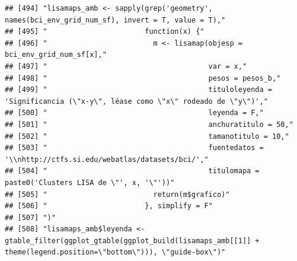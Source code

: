 \documentclass[11pt,]{article}
\begin{document}
\begin{verbatim}
## [494] "lisamaps_amb <- sapply(grep('geometry', names(bci_env_grid_num_sf), invert = T, value = T),"                                                                           
## [495] "                       function(x) {"                                                                                                                                  
## [496] "                         m <- lisamap(objesp = bci_env_grid_num_sf[x],"                                                                                                
## [497] "                                      var = x,"                                                                                                                        
## [498] "                                      pesos = pesos_b,"                                                                                                                
## [499] "                                      tituloleyenda = 'Significancia (\"x-y\", léase como \"x\" rodeado de \"y\")',"                                                   
## [500] "                                      leyenda = F,"                                                                                                                    
## [501] "                                      anchuratitulo = 50,"                                                                                                             
## [502] "                                      tamanotitulo = 10,"                                                                                                              
## [503] "                                      fuentedatos = '\\nhttp://ctfs.si.edu/webatlas/datasets/bci/',"                                                                   
## [504] "                                      titulomapa = paste0('Clusters LISA de \"', x, '\"'))"                                                                            
## [505] "                         return(m$grafico)"                                                                                                                            
## [506] "                       }, simplify = F"                                                                                                                                
## [507] ")"                                                                                                                                                                     
## [508] "lisamaps_amb$leyenda <- gtable_filter(ggplot_gtable(ggplot_build(lisamaps_amb[[1]] + theme(legend.position=\"bottom\"))), \"guide-box\")"                              

\end{verbatim}
\end{document}
